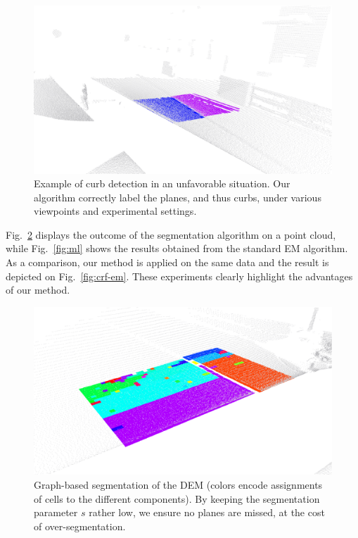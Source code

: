 \begin{figure}[t]
\centering
\includegraphics[width=\columnwidth]{fig/special.eps}
\caption{Example of curb detection in an unfavorable situation. Our algorithm
correctly label the planes, and thus curbs, under various viewpoints and
experimental settings.}
\label{fig:special}
\end{figure}

Fig.~\ref{fig:segment} displays the outcome of the segmentation algorithm on a
point cloud, while Fig.~\ref{fig:ml} shows the results obtained from the
standard EM algorithm. As a comparison, our method is applied on the same data
and the result is depicted on Fig.~\ref{fig:crf-em}. These experiments clearly
highlight the advantages of our method.

\begin{figure}[t]
\centering
\includegraphics[width=\columnwidth]{fig/segment.eps}
\caption{Graph-based segmentation of the DEM (colors encode assignments of
cells to the different components). By keeping the segmentation parameter $s$
rather low, we ensure no planes are missed, at the cost of over-segmentation.}
\label{fig:segment}
\end{figure}

